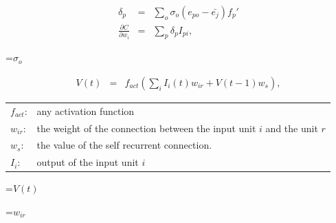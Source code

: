 {\newpage
\clearpage
\samepage \begin{eqnarray*}\delta_{p} & = &\sum_{o}\sigma_{o}(e_{po} - \bar{e_{j}})f_{p}' \nonumber \\ 
\frac{\partial C}{\partial w_{i}} & = & \sum_{p} \delta_{p}I_{pi},
\end{eqnarray*}
}

{\newpage
\clearpage
\samepage \setbox\sizebox=\hbox{$\sigma_{o}$}\box\sizebox
}

{\newpage
\clearpage
\samepage \begin{figure}[htbp]
  \begin{minipage}[h]{7.0cm}
      
      \label{elman net}
  \end{minipage}
  \hfill
  \begin{minipage}[h]{7.0cm}
    \centerline{}
    
    \label{rcc net}
  \end{minipage}
\end{figure}
}

{\newpage
\clearpage
\samepage \begin{eqnarray*}V(t) & = & f_{act}\left(\sum_{i} I_{i}(t)w_{ir} + V(t-1)w_{s} \right),
\label{recact}
\end{eqnarray*}
}

{\newpage
\clearpage
\samepage \begin{tabular}{ll}
$f_{act}$: & any activation function \\ 
$w_{ir}$:  & the weight of the connection between the input unit $i$ and 
             the unit $r$ \\ 
$w_{s}$:   & the value of the self recurrent connection. \\ 
$I_{i}$:   & output of the input unit $i$ 
\end{tabular}
}

{\newpage
\clearpage
\samepage \setbox\sizebox=\hbox{$V(t)$}\box\sizebox
}

{\newpage
\clearpage
\samepage \setbox\sizebox=\hbox{$w_{ir}$}\box\sizebox
}

